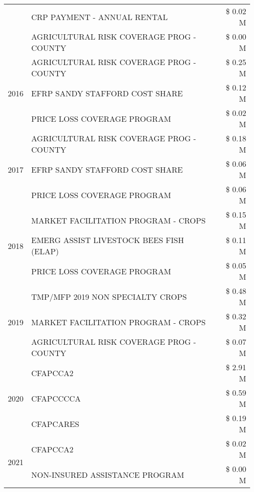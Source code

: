 \begin{tabular}{llr}
 & CRP PAYMENT - ANNUAL RENTAL & \$ 0.02 M \\
 & AGRICULTURAL RISK COVERAGE PROG - COUNTY & \$ 0.00 M \\
\cline{1-3}
\multirow[t]{3}{*}{2016} & AGRICULTURAL RISK COVERAGE PROG - COUNTY & \$ 0.25 M \\
 & EFRP SANDY STAFFORD COST SHARE & \$ 0.12 M \\
 & PRICE LOSS COVERAGE PROGRAM & \$ 0.02 M \\
\cline{1-3}
\multirow[t]{3}{*}{2017} & AGRICULTURAL RISK COVERAGE PROG - COUNTY & \$ 0.18 M \\
 & EFRP SANDY STAFFORD COST SHARE & \$ 0.06 M \\
 & PRICE LOSS COVERAGE PROGRAM & \$ 0.06 M \\
\cline{1-3}
\multirow[t]{3}{*}{2018} & MARKET FACILITATION PROGRAM - CROPS & \$ 0.15 M \\
 & EMERG ASSIST LIVESTOCK BEES FISH (ELAP) & \$ 0.11 M \\
 & PRICE LOSS COVERAGE PROGRAM & \$ 0.05 M \\
\cline{1-3}
\multirow[t]{3}{*}{2019} & TMP/MFP 2019 NON SPECIALTY CROPS & \$ 0.48 M \\
 & MARKET FACILITATION PROGRAM - CROPS & \$ 0.32 M \\
 & AGRICULTURAL RISK COVERAGE PROG - COUNTY & \$ 0.07 M \\
\cline{1-3}
\multirow[t]{3}{*}{2020} & CFAPCCA2 & \$ 2.91 M \\
 & CFAPCCCCA & \$ 0.59 M \\
 & CFAPCARES & \$ 0.19 M \\
\cline{1-3}
\multirow[t]{2}{*}{2021} & CFAPCCA2 & \$ 0.02 M \\
 & NON-INSURED ASSISTANCE PROGRAM & \$ 0.00 M \\
\cline{1-3}
\bottomrule
\end{tabular}
